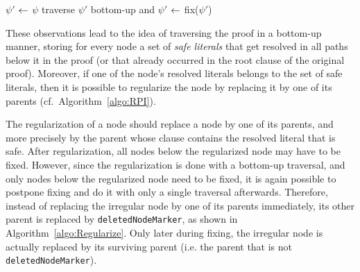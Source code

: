 \begin{algorithm}[bt]
\begin{footnotesize}


\BlankLine

$\psi'$ $\leftarrow$ $\psi$\;
traverse $\psi'$ bottom-up and 
$\psi'$ $\leftarrow$ fix($\psi'$) \;
\;
\caption{\label{algo:RPI} \texttt{\RPI}}
\end{footnotesize}
\end{algorithm}


These observations lead to the idea of traversing the proof in a bottom-up
manner, storing for every node a set of \emph{safe literals} that get resolved
in all paths below it in the proof (or that already occurred in the root clause
of the original proof). Moreover, if one of the node's resolved literals belongs
to the set of safe literals, then it is possible to regularize the node by
replacing it by one of its parents (cf.\ Algorithm~\ref{algo:RPI}). 

The regularization of a node should replace a node by one of its parents, and more precisely by the parent whose clause contains the resolved literal that is safe. After regularization, all nodes below the regularized node may have to be fixed. However, since the regularization is done with a bottom-up traversal, and only nodes below the regularized node need to be fixed, it is again possible to postpone fixing and do it with only a single traversal afterwards. 
Therefore, instead of replacing the irregular node by one of its parents immediately, 
its other parent is replaced by \texttt{deletedNodeMarker}, as shown in Algorithm~\ref{algo:Regularize}. Only later during fixing, 
the irregular node is actually replaced by its surviving parent (i.e. the parent that is not \texttt{deletedNodeMarker}).



